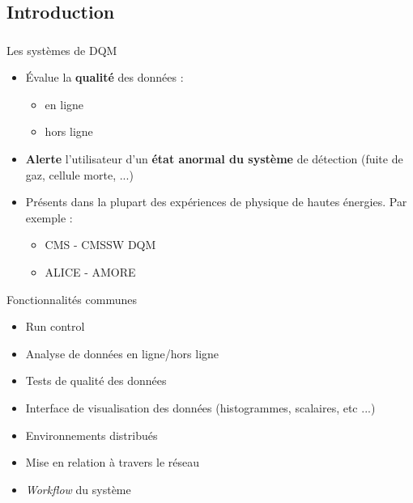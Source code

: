 \documentclass[8pt]{beamer}
\begin{document}
  \subsection{Introduction}
  \begin{frame}
  \frametitle{\secname}
  \framesubtitle{\subsecname}
  \small
    \begin{block}{Les systèmes de DQM}
      \begin{itemize}
        \item Évalue la \textbf{qualité} des données :
        \begin{itemize}
          \item en ligne
          \item hors ligne
        \end{itemize}
        \item \textbf{Alerte} l'utilisateur d'un \textbf{état anormal du système} de détection (fuite de gaz, cellule morte, ...)
        \item Présents dans la plupart des expériences de physique de hautes énergies. Par exemple :
        \begin{itemize}
          \item CMS   - CMSSW DQM
          \item ALICE - AMORE
        \end{itemize}
      \end{itemize}
    \end{block}
    \pause
    \begin{minipage}{0.47\linewidth}
      \begin{block}{Fonctionnalités communes}
        \begin{itemize}
          \item Run control
          \item Analyse de données en ligne/hors ligne
          \item Tests de qualité des données
          \item Interface de visualisation des données (histogrammes, scalaires, etc ...)
          \item Environnements distribués
          \item Mise en relation à travers le réseau
          \item \textit{Workflow} du système
        \end{itemize}
      \end{block}
    \end{minipage} \hfill
    \begin{minipage}{0.47\linewidth}

\end{minipage}
\end{frame}
\end{document}

